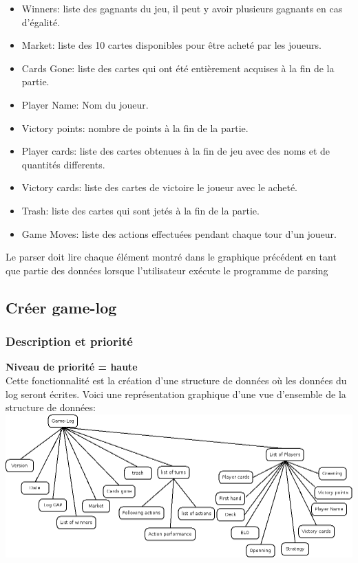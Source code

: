 \documentclass{scrreprt}
\begin{document}
\begin{itemize}
\item Winners: liste des gagnants du jeu, il peut y avoir plusieurs gagnants en cas d'égalité.
\item Market: liste des 10 cartes disponibles pour être acheté par les joueurs.
\item Cards Gone: liste des cartes qui ont été entièrement acquises à la fin de la partie.
\item Player Name: Nom du joueur.
\item Victory points: nombre de points à la fin de la partie.
\item Player cards: liste des cartes obtenues à la fin de jeu avec des noms et de quantités differents.
\item Victory cards: liste des cartes de victoire le joueur avec le acheté.
\item Trash: liste des cartes qui sont jetés à la fin de la partie.
\item Game Moves: liste des actions effectuées pendant chaque tour d'un joueur.
\end{itemize}
Le parser doit lire chaque élément montré dans le graphique précédent en tant que partie des données lorsque l'utilisateur exécute le programme de parsing\\

\subsection{Créer game-log}
\subsubsection{Description et priorité}
\textbf{Niveau de priorité = haute}\\
Cette fonctionnalité est la création d'une structure de données où les données du log seront écrites.
Voici une représentation graphique d'une vue d'ensemble de la structure de données:\\
\includegraphics[scale=0.5,keepaspectratio]{game-log}
\end{document}
